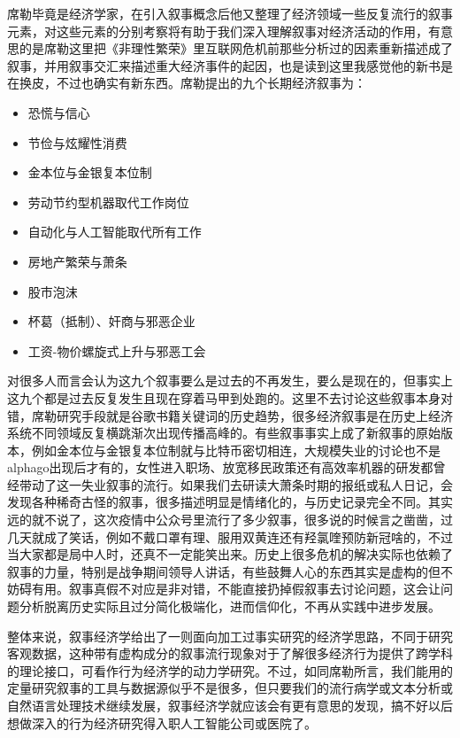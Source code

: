 \documentclass[
]{book}
\providecommand{\tightlist}{%
  \setlength{\itemsep}{0pt}\setlength{\parskip}{0pt}}
\begin{document}
席勒毕竟是经济学家，在引入叙事概念后他又整理了经济领域一些反复流行的叙事元素，对这些元素的分别考察将有助于我们深入理解叙事对经济活动的作用，有意思的是席勒这里把《非理性繁荣》里互联网危机前那些分析过的因素重新描述成了叙事，并用叙事交汇来描述重大经济事件的起因，也是读到这里我感觉他的新书是在换皮，不过也确实有新东西。席勒提出的九个长期经济叙事为：

\begin{itemize}
\tightlist
\item
  恐慌与信心
\item
  节俭与炫耀性消费
\item
  金本位与金银复本位制
\item
  劳动节约型机器取代工作岗位
\item
  自动化与人工智能取代所有工作
\item
  房地产繁荣与萧条
\item
  股市泡沫
\item
  杯葛（抵制）、奸商与邪恶企业
\item
  工资-物价螺旋式上升与邪恶工会
\end{itemize}

对很多人而言会认为这九个叙事要么是过去的不再发生，要么是现在的，但事实上这九个都是过去反复发生且现在穿着马甲到处跑的。这里不去讨论这些叙事本身对错，席勒研究手段就是谷歌书籍关键词的历史趋势，很多经济叙事是在历史上经济系统不同领域反复横跳渐次出现传播高峰的。有些叙事事实上成了新叙事的原始版本，例如金本位与金银复本位制就与比特币密切相连，大规模失业的讨论也不是alphago出现后才有的，女性进入职场、放宽移民政策还有高效率机器的研发都曾经带动了这一失业叙事的流行。如果我们去研读大萧条时期的报纸或私人日记，会发现各种稀奇古怪的叙事，很多描述明显是情绪化的，与历史记录完全不同。其实远的就不说了，这次疫情中公众号里流行了多少叙事，很多说的时候言之凿凿，过几天就成了笑话，例如不戴口罩有理、服用双黄连还有羟氯喹预防新冠啥的，不过当大家都是局中人时，还真不一定能笑出来。历史上很多危机的解决实际也依赖了叙事的力量，特别是战争期间领导人讲话，有些鼓舞人心的东西其实是虚构的但不妨碍有用。叙事真假不对应是非对错，不能直接扔掉假叙事去讨论问题，这会让问题分析脱离历史实际且过分简化极端化，进而信仰化，不再从实践中进步发展。

整体来说，叙事经济学给出了一则面向加工过事实研究的经济学思路，不同于研究客观数据，这种带有虚构成分的叙事流行现象对于了解很多经济行为提供了跨学科的理论接口，可看作行为经济学的动力学研究。不过，如同席勒所言，我们能用的定量研究叙事的工具与数据源似乎不是很多，但只要我们的流行病学或文本分析或自然语言处理技术继续发展，叙事经济学就应该会有更有意思的发现，搞不好以后想做深入的行为经济研究得入职人工智能公司或医院了。
\end{document}

